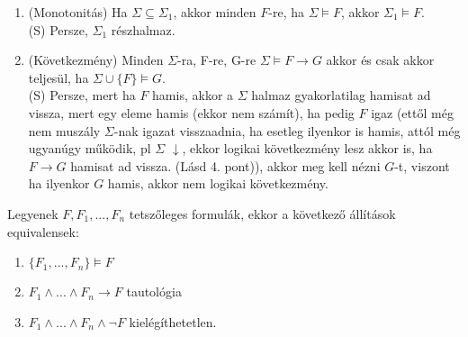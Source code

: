 \begin{frame}
\begin{tcolorbox}[title={Ész}]
\begin{enumerate}
{\tiny (S) 3. 5. 8. pontok összekombinálása eggyé.}\\
\item (Monotonitás) Ha $\Sigma \subseteq {\Sigma}_1$, akkor minden $F$-re, ha $\Sigma \models F$, akkor ${\Sigma}_1 \models F$.\\
{\tiny (S) Persze, ${\Sigma}_1$ részhalmaz.}\\
\item (Következmény) Minden $\Sigma$-ra, F-re, G-re $\Sigma \models F \rightarrow G$ akkor és csak akkor teljesül, ha $\Sigma \cup \{F\} \models G$.\\
{\tiny (S) Persze, mert ha $F$ hamis, akkor a $\Sigma$ halmaz gyakorlatilag hamisat ad vissza, mert egy eleme hamis (ekkor nem számít), ha pedig $F$ igaz (ettől még nem muszály $\Sigma$-nak igazat visszaadnia, ha esetleg ilyenkor is hamis, attól még ugyanúgy működik, pl $\Sigma$ $\downarrow$, ekkor logikai következmény lesz akkor is, ha $F \rightarrow G$ hamisat ad vissza. (Lásd 4. pont)), akkor meg kell nézni $G$-t, viszont ha ilyenkor $G$ hamis, akkor nem logikai következmény.}
\end{enumerate}
\end{tcolorbox}

\end{frame}

\begin{frame}

\begin{tcolorbox}[title={tétel: Ekvivalens állítások formulákra}]
Legyenek $F, F_1, ... , F_n$ tetszőleges formulák, ekkor a következő állítások equivalensek:
\begin{enumerate}
\item $\{F_1, ... , F_n\} \models F$
\item $F_1 \land ... \land F_n \rightarrow F$ tautológia
\item $F_1 \land ... \land F_n \land \neg F$ kielégíthetetlen.
\end{enumerate}
\end{tcolorbox}

\end{frame}

